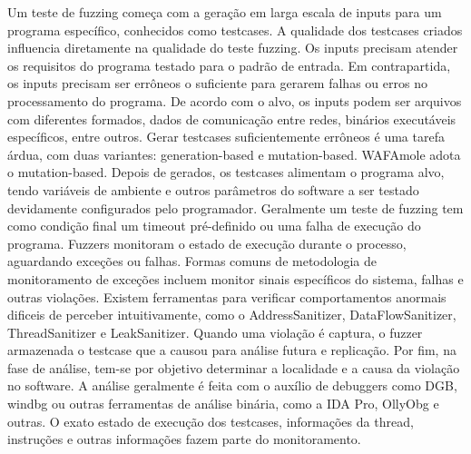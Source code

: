 Um teste de fuzzing começa com a geração em larga escala de inputs para um programa específico, conhecidos como testcases. A qualidade dos testcases criados influencia diretamente na qualidade do teste fuzzing. Os inputs precisam atender os requisitos do programa testado para o padrão de entrada. Em contrapartida, os inputs precisam ser errôneos o suficiente para gerarem falhas ou erros no processamento do programa.
De acordo com o alvo, os inputs podem ser arquivos com diferentes formados, dados de comunicação entre redes, binários executáveis específicos, entre outros. 
Gerar testcases suficientemente errôneos é uma tarefa árdua, com duas variantes: generation-based e mutation-based. WAFAmole adota o mutation-based.
Depois de gerados, os testcases alimentam o programa alvo, tendo variáveis de ambiente e outros parâmetros do software a ser testado devidamente configurados pelo programador. Geralmente um teste de fuzzing tem como condição final um timeout pré-definido ou uma falha de execução do programa.
Fuzzers monitoram o estado de execução durante o processo, aguardando exceções ou falhas.  Formas comuns de metodologia de monitoramento de exceções incluem monitor sinais específicos do sistema, falhas e outras violações. Existem ferramentas para verificar comportamentos anormais dificeis de perceber intuitivamente, como o AddressSanitizer, DataFlowSanitizer, ThreadSanitizer e LeakSanitizer. Quando uma violação é captura, o fuzzer armazenada o testcase que a causou para análise futura e replicação.
Por fim, na fase de análise, tem-se por objetivo determinar a localidade e a causa da violação no software. A análise geralmente é feita com o auxílio de debuggers como DGB, windbg ou outras ferramentas de análise binária, como a IDA Pro, OllyObg e outras. O exato estado de execução dos testcases, informações da thread, instruções e outras informações fazem parte do monitoramento.


